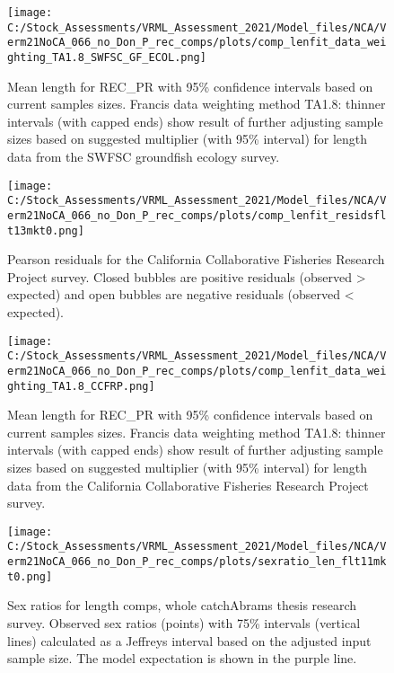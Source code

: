 \documentclass[11pt,
  english,
  a4paper,
]{article}
\begin{document}
\begin{figure}
\centering
\texttt{[image: C:/Stock\_Assessments/VRML\_Assessment\_2021/Model\_files/NCA/Verm21NoCA\_066\_no\_Don\_P\_rec\_comps/plots/comp\_lenfit\_data\_weighting\_TA1.8\_SWFSC\_GF\_ECOL.png]}
\caption{Mean length for REC\_PR with 95\% confidence intervals based on current samples sizes. Francis data weighting method TA1.8: thinner intervals (with capped ends) show result of further adjusting sample sizes based on suggested multiplier (with 95\% interval) for length data from the SWFSC groundfish ecology survey.\label{fig:mean-len-fit-SWFSC-GF-ECOL}}
\end{figure}

\begin{figure}
\centering
\texttt{[image: C:/Stock\_Assessments/VRML\_Assessment\_2021/Model\_files/NCA/Verm21NoCA\_066\_no\_Don\_P\_rec\_comps/plots/comp\_lenfit\_residsflt13mkt0.png]}
\caption{Pearson residuals for the California Collaborative Fisheries Research Project survey. Closed bubbles are positive residuals (observed \textgreater{} expected) and open bubbles are negative residuals (observed \textless{} expected).\label{fig:len-pearson-CCFRP}}
\end{figure}

\begin{figure}
\centering
\texttt{[image: C:/Stock\_Assessments/VRML\_Assessment\_2021/Model\_files/NCA/Verm21NoCA\_066\_no\_Don\_P\_rec\_comps/plots/comp\_lenfit\_data\_weighting\_TA1.8\_CCFRP.png]}
\caption{Mean length for REC\_PR with 95\% confidence intervals based on current samples sizes. Francis data weighting method TA1.8: thinner intervals (with capped ends) show result of further adjusting sample sizes based on suggested multiplier (with 95\% interval) for length data from the California Collaborative Fisheries Research Project survey.\label{fig:mean-len-fit-CCFRP}}
\end{figure}

\begin{figure}
\centering
\texttt{[image: C:/Stock\_Assessments/VRML\_Assessment\_2021/Model\_files/NCA/Verm21NoCA\_066\_no\_Don\_P\_rec\_comps/plots/sexratio\_len\_flt11mkt0.png]}
\caption{Sex ratios for length comps, whole catchAbrams thesis research survey. Observed sex ratios (points) with 75\% intervals (vertical lines) calculated as a Jeffreys interval based on the adjusted input sample size. The model expectation is shown in the purple line.\label{fig:sexratio-ABRAMS-RESEARCH}}
\end{figure}
\end{document}
